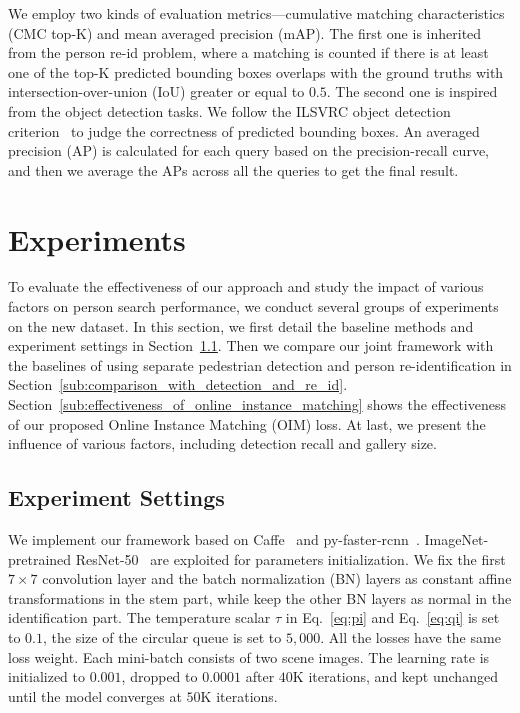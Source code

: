 We employ two kinds of evaluation metrics---cumulative matching characteristics (CMC top-K) and mean averaged precision (mAP). The first one is inherited from the person re-id problem, where a matching is counted if there is at least one of the top-K predicted bounding boxes overlaps with the ground truths with intersection-over-union (IoU) greater or equal to $0.5$. The second one is inspired from the object detection tasks. We follow the ILSVRC object detection criterion~\cite{russakovsky2014imagenet} to judge the correctness of predicted bounding boxes. An averaged precision (AP) is calculated for each query based on the precision-recall curve, and then we average the APs across all the queries to get the final result.

\section{Experiments} %
\label{sec:experiments}
To evaluate the effectiveness of our approach and study the impact of various factors on person search performance, we conduct several groups of experiments on the new dataset. In this section, we first detail the baseline methods and experiment settings in Section~\ref{sub:experiment_settings}. Then we compare our joint framework with the baselines of using separate pedestrian detection and person re-identification in Section~\ref{sub:comparison_with_detection_and_re_id}. Section~\ref{sub:effectiveness_of_online_instance_matching} shows the effectiveness of our proposed Online Instance Matching (OIM) loss. At last, we present the influence of various factors, including detection recall and gallery size.

\subsection{Experiment Settings} %
\label{sub:experiment_settings}
We implement our framework based on Caffe~\cite{jia2014caffe,wang2016temporal} and py-faster-rcnn~\cite{girshick2015fast,ren2015faster}. ImageNet-pretrained ResNet-50~\cite{he2015deep} are exploited for parameters initialization. We fix the first $7\times 7$ convolution layer and the batch normalization (BN) layers as constant affine transformations in the stem part, while keep the other BN layers as normal in the identification part. The temperature scalar $\tau$ in Eq.~\eqref{eq:pi} and Eq.~\eqref{eq:qi} is set to $0.1$, the size of the circular queue is set to $5,000$. All the losses have the same loss weight. Each mini-batch consists of two scene images. The learning rate is initialized to $0.001$, dropped to $0.0001$ after $40$K iterations, and kept unchanged until the model converges at $50$K iterations.

